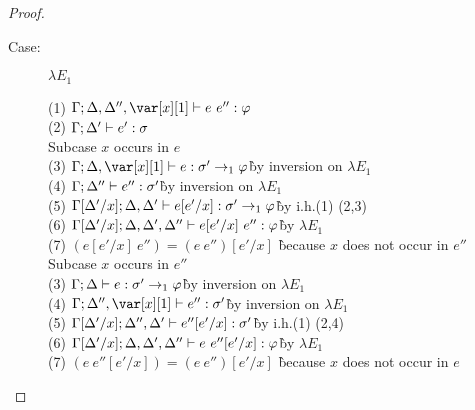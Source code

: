 \begin{proof}
\begin{description}

\item[Case:] $\lambda E_1$
\begin{tabbing}
  (1) $\G; \D,\D'',\xl \vdash e~e'' : \vp$\\
  (2) $\Gamma; \Delta' \vdash e' : \sigma$\\
  Subcase $x$ occurs in $e$\\
  (3) $\G; \D,\xl \vdash e : \s' \to_1 \vp$\` by inversion on $\lambda E_1$\\
  (4) $\Gamma; \Delta'' \vdash e'' : \sigma'$\` by inversion on $\lambda E_1$\\
  (5) $\Gamma[\Delta'/x]; \Delta, \Delta' \vdash e[e'/x] : \sigma' \to_1 \varphi$\` by i.h.(1) (2,3)\\
  (6) $\Gamma[\Delta'/x]; \Delta, \Delta', \Delta'' \vdash e[e'/x]~e'' : \varphi$\` by $\lambda E_1$\\
  (7) $(e[e'/x]~e'') = (e~e'')[e'/x]$ \` because $x$ does not occur in $e''$\\
  Subcase $x$ occurs in $e''$\\
  (3) $\Gamma; \Delta \vdash e : \sigma' \to_1 \varphi$\` by inversion on $\lambda E_1$\\
  (4) $\G; \D'', \xl \vdash e'' : \s'$\` by inversion on $\lambda E_1$\\
  (5) $\Gamma[\Delta'/x]; \Delta'',\Delta' \vdash e''[e'/x] : \sigma'$\` by i.h.(1) (2,4)\\
  (6) $\Gamma[\Delta'/x]; \Delta,\Delta',\Delta'' \vdash e~e''[e'/x] : \varphi$\` by $\lambda E_1$\\
  (7) $(e~e''[e'/x]) = (e~e'')[e'/x]$ \` because $x$ does not occur in $e$\\
\end{tabbing}


\end{description}
\end{proof}
